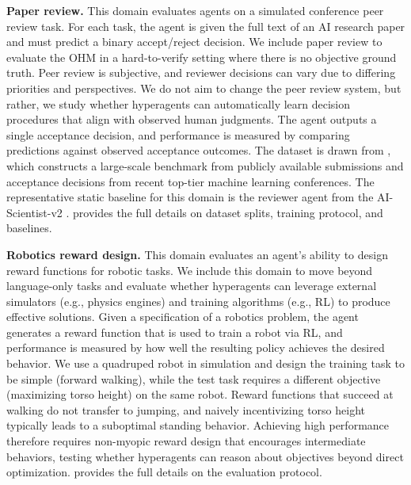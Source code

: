 \documentclass[]{fairmeta}
\begin{document}
\textbf{Paper review.}
This domain evaluates agents on a simulated conference peer review task. For each task, the agent is given the full text of an AI research paper and must predict a binary accept/reject decision. We include paper review to evaluate the OHM in a hard-to-verify setting where there is no objective ground truth. Peer review is subjective, and reviewer decisions can vary due to differing priorities and perspectives. We do not aim to change the peer review system, but rather, we study whether hyperagents can automatically learn decision procedures that align with observed human judgments. The agent outputs a single acceptance decision, and performance is measured by comparing predictions against observed acceptance outcomes. The dataset is drawn from \citet{zhao2026apres}, which constructs a large-scale benchmark from publicly available submissions and acceptance decisions from recent top-tier machine learning conferences. The representative static baseline for this domain is the reviewer agent from the AI-Scientist-v2 \citep{yamada2025ai}.  provides the full details on dataset splits, training protocol, and baselines.

\textbf{Robotics reward design.}
This domain evaluates an agent's ability to design reward functions for robotic tasks. We include this domain to move beyond language-only tasks and evaluate whether hyperagents can leverage external simulators (e.g., physics engines) and training algorithms (e.g., RL) to produce effective solutions. Given a specification of a robotics problem, the agent generates a reward function that is used to train a robot via RL, and performance is measured by how well the resulting policy achieves the desired behavior. We use a quadruped robot in simulation \citep{genesis2024} and design the training task to be simple (forward walking), while the test task requires a different objective (maximizing torso height) on the same robot. Reward functions that succeed at walking do not transfer to jumping, and naively incentivizing torso height typically leads to a suboptimal standing behavior. Achieving high performance therefore requires non-myopic reward design that encourages intermediate behaviors, testing whether hyperagents can reason about objectives beyond direct optimization.  provides the full details on the evaluation protocol.
\end{document}
